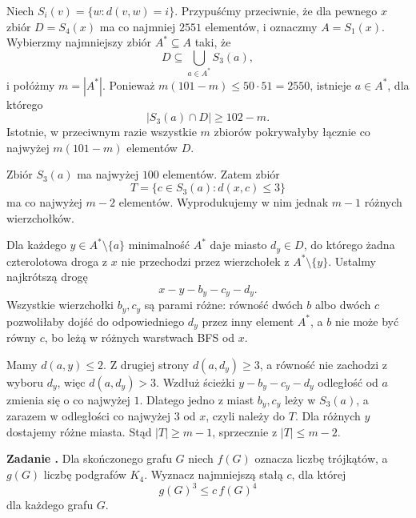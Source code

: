 \documentclass{lecture-kuznia}
\newcounter{zadanie}
\newenvironment{zadanie}[1]{%
	\refstepcounter{zadanie}%
	\par\medskip\noindent
	\textbf{Zadanie \thezadanie.}\quad
}{\par\medskip}
\begin{document}
\begin{solutionbox}
Niech $S_i(v)=\{w:d(v,w)=i\}$. Przypuśćmy przeciwnie, że dla pewnego $x$
zbiór $D=S_4(x)$ ma co najmniej $2551$ elementów, i oznaczmy $A=S_1(x)$.
Wybierzmy najmniejszy zbiór $A^*\subseteq A$ taki, że
\[
  D\subseteq\bigcup_{a\in A^*}S_3(a),
\]
i połóżmy $m=|A^*|$. Ponieważ $m(101-m)\leqslant50\cdot51=2550$, istnieje
$a\in A^*$, dla którego
\[
  |S_3(a)\cap D|\geqslant102-m.
\]
Istotnie, w przeciwnym razie wszystkie $m$ zbiorów pokrywałyby łącznie co
najwyżej $m(101-m)$ elementów $D$.

Zbiór $S_3(a)$ ma najwyżej $100$ elementów. Zatem zbiór
\[
  T=\{c\in S_3(a):d(x,c)\leqslant3\}
\]
ma co najwyżej $m-2$ elementów. Wyprodukujemy w nim jednak $m-1$ różnych
wierzchołków.

Dla każdego $y\in A^*\setminus\{a\}$ minimalność $A^*$ daje miasto
$d_y\in D$, do którego żadna czterolotowa droga z $x$ nie przechodzi przez
wierzchołek z $A^*\setminus\{y\}$. Ustalmy najkrótszą drogę
\[
  x-y-b_y-c_y-d_y.
\]
Wszystkie wierzchołki $b_y,c_y$ są parami różne: równość dwóch
$b$ albo dwóch $c$ pozwoliłaby dojść do odpowiedniego $d_y$ przez inny
element $A^*$, a $b$ nie może być równy $c$, bo leżą w różnych warstwach
BFS od $x$.

Mamy $d(a,y)\leqslant2$. Z drugiej strony $d(a,d_y)\geqslant3$, a równość
nie zachodzi z wyboru $d_y$, więc $d(a,d_y)>3$. Wzdłuż ścieżki
$y-b_y-c_y-d_y$ odległość od $a$ zmienia się o co najwyżej $1$. Dlatego
jedno z miast $b_y,c_y$ leży w $S_3(a)$, a zarazem w odległości co najwyżej
$3$ od $x$, czyli należy do $T$. Dla różnych $y$ dostajemy różne miasta.
Stąd $|T|\geqslant m-1$, sprzecznie z $|T|\leqslant m-2$.
\end{solutionbox}

\begin{zadanie}{bardzo trudne} %
Dla skończonego grafu $G$ niech $f(G)$ oznacza liczbę trójkątów, a $g(G)$
liczbę podgrafów $K_4$. Wyznacz najmniejszą stałą $c$, dla której
\[
  g(G)^3\leqslant c\,f(G)^4
\]
dla każdego grafu $G$.
\end{zadanie}
\end{document}
